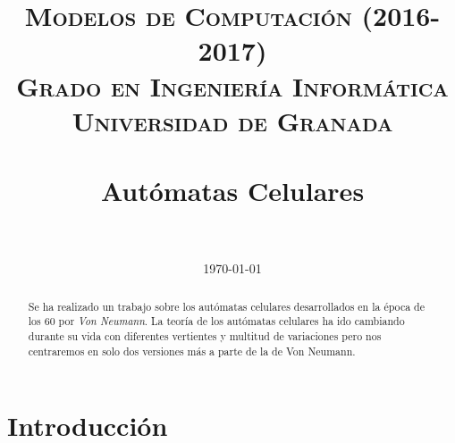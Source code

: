 


\title{	
\normalfont \normalsize 
\textsc{\textbf{Modelos de Computación (2016-2017)} \\ Grado en Ingeniería Informática \\ Universidad de Granada} \\ [25pt] %
\horrule{0.5pt} \\[0.4cm] %
\huge Autómatas Celulares \\ %
\horrule{2pt} \\[0.5cm] %
}

\date{\normalsize\today} %




\maketitle %

\newpage

\begin{abstract} 
Se ha realizado un trabajo sobre los autómatas celulares desarrollados en la época de los 60 por \textit{Von Neumann}. La teoría de los autómatas celulares ha ido cambiando durante su vida con diferentes vertientes y multitud de variaciones pero nos centraremos en solo dos versiones más a parte de la de Von Neumann.


\end{abstract}


\section{Introducción} %

